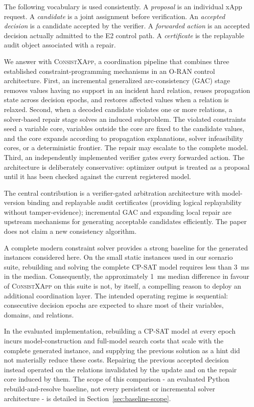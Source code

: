 \documentclass[pdflatex,sn-mathphys-num,iicol,oneside]{sn-jnl}
\newcommand{\method}{\textsc{ConsistXApp}\xspace}
\newcommand{\gac}{\textsc{GAC}\xspace}
\newcommand{\cpsat}{\textsc{CP-SAT}\xspace}
\begin{document}
The following vocabulary is used consistently. A \emph{proposal} is an
individual xApp request. A \emph{candidate} is a joint assignment
before verification. An \emph{accepted decision} is a candidate
accepted by the verifier. A \emph{forwarded action} is an accepted
decision actually admitted to the E2 control path. A
\emph{certificate} is the replayable audit object associated with a
repair.

We answer with \method, a coordination pipeline that combines three
established constraint-programming mechanisms in an O-RAN control
architecture. First, an incremental generalized arc-consistency
(\gac) stage removes values having no support in an incident hard
relation, reuses propagation state across decision epochs, and
restores affected values when a relation is relaxed. Second, when a
decoded candidate violates one or more relations, a solver-based
repair stage solves an induced subproblem. The violated constraints
seed a variable core, variables outside the core are fixed to the
candidate values, and the core expands according to propagation
explanations, solver infeasibility cores, or a deterministic frontier.
The repair may escalate to the complete model. Third, an independently
implemented verifier gates every forwarded action. The architecture is
deliberately conservative: optimizer output is treated as a proposal
until it has been checked against the current registered model.

The central contribution is a verifier-gated arbitration architecture
with model-version binding and replayable audit certificates (providing logical replayability without tamper-evidence);
incremental \gac and expanding local repair are upstream mechanisms
for generating acceptable candidates efficiently. The paper does not
claim a new consistency algorithm.

A complete modern constraint solver provides a strong baseline for
the generated instances considered here.
On the small static instances used in our scenario suite, rebuilding
and solving the complete \cpsat model requires less than 3~ms in the
median. Consequently, the approximately 1~ms median difference in
favour of \method on this suite is not, by itself, a compelling reason
to deploy an additional coordination layer. The intended operating
regime is sequential: consecutive decision epochs are expected to
share most of their variables, domains, and relations.

In the evaluated implementation, rebuilding a \cpsat model at every
epoch incurs model-construction and full-model search costs that scale
with the complete generated instance, and supplying the previous
solution as a hint did not materially reduce these costs. Repairing
the previous accepted decision instead operated on the relations
invalidated by the update and on the repair core induced by them. The
scope of this comparison - an evaluated Python rebuild-and-resolve
baseline, not every persistent or incremental solver architecture - is
detailed in Section~\ref{sec:baseline-scope}.
\end{document}
